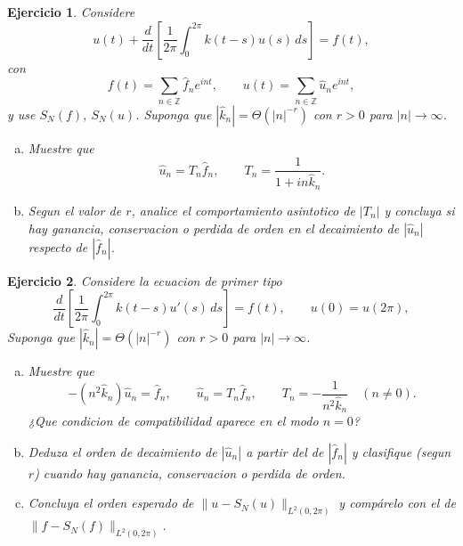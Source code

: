 \documentclass[12pt]{article}
\newtheorem{exercise}{Ejercicio}
\newcommand{\bej}{\begin{exercise}\rm}
\newcommand{\fej}{\end{exercise}}
\begin{document}
\bej
Considere
\[
u(t)+\frac{d}{dt}\left[\frac{1}{2\pi}\int_0^{2\pi}k(t-s)u(s)\,ds\right]=f(t),
\]
con
\[
f(t)=\sum_{n\in\mathbb Z}\hat f_n e^{int},
\qquad
u(t)=\sum_{n\in\mathbb Z}\hat u_n e^{int},
\]
y use $S_N(f)$, $S_N(u)$.
Suponga que $|\hat k_n|=\Theta(|n|^{-r})$ con $r>0$ para $|n|\to\infty$.
\begin{enumerate}[(a)]
    \item Muestre que
    \[
    \hat u_n=T_n\hat f_n,
    \qquad
    T_n=\frac{1}{1+in\hat k_n}.
    \]
    \item Segun el valor de $r$, analice el comportamiento asintotico de $|T_n|$ y concluya si hay ganancia, conservacion o perdida de orden en el decaimiento de $|\hat u_n|$ respecto de $|\hat f_n|$.
\end{enumerate}
\fej

\bej
Considere la ecuacion de primer tipo
\[
\frac{d}{dt}\left[\frac{1}{2\pi}\int_0^{2\pi}k(t-s)u'(s)\,ds\right]=f(t), \qquad u(0)=u(2\pi),
\]
Suponga que $|\hat k_n|=\Theta(|n|^{-r})$ con $r>0$ para $|n|\to\infty$.
\begin{enumerate}[(a)]
    \item Muestre que
    \[
    -(n^2\hat k_n)\hat u_n=\hat f_n,
    \qquad
    \hat u_n=T_n\hat f_n,
    \qquad
    T_n=-\frac{1}{n^2\hat k_n}\quad (n\neq 0).
    \]
    ¿Que condicion de compatibilidad aparece en el modo $n=0$?
    \item Deduza el orden de decaimiento de $|\hat u_n|$ a partir del de $|\hat f_n|$ y clasifique (segun $r$) cuando hay ganancia, conservacion o perdida de orden.
    \item Concluya el orden esperado de $\|u-S_N(u)\|_{L^2(0,2\pi)}$ y compárelo con el de $\|f-S_N(f)\|_{L^2(0,2\pi)}$.
\end{enumerate}
\fej
\end{document}
